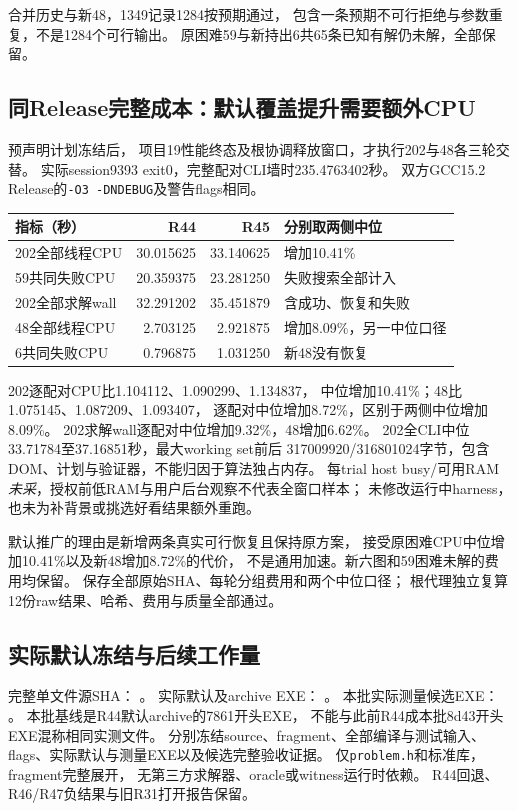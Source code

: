 \documentclass[UTF8,fontset=fandol,11pt]{ctexart}
\begin{document}
合并历史与新48，1349记录1284按预期通过，
包含一条预期不可行拒绝与参数重复，不是1284个可行输出。
原困难59与新持出6共65条已知有解仍未解，全部保留。

\subsection{同Release完整成本：默认覆盖提升需要额外CPU}
预声明计划冻结后，
项目19性能终态及根协调释放窗口，才执行202与48各三轮交替。
实际session9393 exit0，完整配对CLI墙时235.4763402秒。
双方GCC15.2 Release的\texttt{-O3 -DNDEBUG}及警告flags相同。
\begin{tabularx}{\textwidth}{L{4.1cm}rrX}
\toprule
指标（秒） & R44 & R45 & 分别取两侧中位\\
\midrule
202全部线程CPU &30.015625&33.140625&增加10.41\%\\
59共同失败CPU &20.359375&23.281250&失败搜索全部计入\\
202全部求解wall &32.291202&35.451879&含成功、恢复和失败\\
48全部线程CPU &2.703125&2.921875&增加8.09\%，另一中位口径\\
6共同失败CPU &0.796875&1.031250&新48没有恢复\\
\bottomrule
\end{tabularx}

202逐配对CPU比1.104112、1.090299、1.134837，
中位增加10.41\%；48比1.075145、1.087209、1.093407，
逐配对中位增加8.72\%，区别于两侧中位增加8.09\%。
202求解wall逐配对中位增加9.32\%，48增加6.62\%。
202全CLI中位33.71784至37.16851秒，最大working set前后
317009920/316801024字节，包含DOM、计划与验证器，不能归因于算法独占内存。
每trial host busy/可用RAM\emph{未采}，授权前低RAM与用户后台观察不代表全窗口样本；
未修改运行中harness，也未为补背景或挑选好看结果额外重跑。

默认推广的理由是新增两条真实可行恢复且保持原方案，
接受原困难CPU中位增加10.41\%以及新48增加8.72\%的代价，
不是通用加速。新六图和59困难未解的费用均保留。
保存全部原始SHA、每轮分组费用和两个中位口径；
根代理独立复算12份raw结果、哈希、费用与质量全部通过。

\subsection{实际默认冻结与后续工作量}
完整单文件源SHA：
。
实际默认及archive EXE：
。
本批实际测量候选EXE：
。
本批基线是R44默认archive的7861开头EXE，
不能与此前R44成本批8d43开头EXE混称相同实测文件。
分别冻结source、fragment、全部编译与测试输入、
flags、实际默认与测量EXE以及候选完整验收证据。
仅\texttt{problem.h}和标准库，fragment完整展开，
无第三方求解器、oracle或witness运行时依赖。
R44回退、R46/R47负结果与旧R31打开报告保留。
\end{document}
